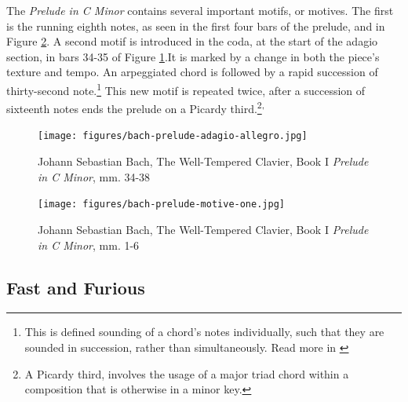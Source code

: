 The \textit{Prelude in C Minor} contains several important motifs, or motives. The first is the running eighth notes, as seen in the first four bars of the prelude, and in Figure \ref{fig:bach-first-motive}\autocite{Henle_2009}. A second motif is introduced in the coda, at the start of the adagio section, in bars 34-35 of Figure \ref{fig:prelude-recitative}\autocite{Henle_2009}.It is marked by a change in both the piece's texture and tempo. An arpeggiated chord is followed by a rapid succession of thirty-second note.\footnote{This is defined sounding of a chord's notes individually, such that they are sounded in succession, rather than simultaneously. Read more in \cite{Arpeggio_2001}} This new motif is repeated twice, after a succession of sixteenth notes ends the prelude on a Picardy third.\footnote{A Picardy third, involves the usage of a major triad chord within a composition that is otherwise in a minor key.}\textsuperscript{,}\autocite{Latham_2011a}

\begin{figure}[ht]
    \centering
    \texttt{[image: figures/bach-prelude-adagio-allegro.jpg]}
    \caption{Johann Sebastian Bach, The Well-Tempered Clavier, Book I \textit{Prelude in C Minor}, mm. 34-38}
    \label{fig:prelude-recitative}
\end{figure}

\begin{figure}[ht]
    \centering
    \texttt{[image: figures/bach-prelude-motive-one.jpg]}
    \caption{Johann Sebastian Bach, The Well-Tempered Clavier, Book I \textit{Prelude in C Minor}, mm. 1-6}
    \label{fig:bach-first-motive}
\end{figure}

\subsection{Fast and Furious}

